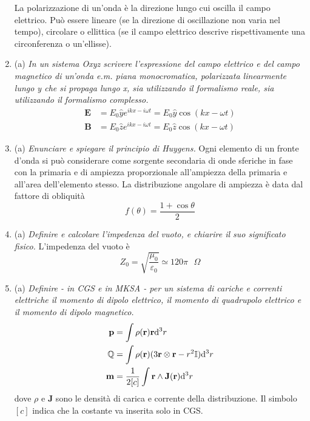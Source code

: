 \documentclass{article}
\renewcommand{\a}{(a)}
\renewcommand{\t}[1]{\textit{ #1}}
\renewcommand{\vec}[1]{\mathbf{#1}}
\begin{document}
\begin{enumerate}
		La polarizzazione di un'onda è la direzione lungo cui oscilla il campo elettrico. Può essere lineare (se la direzione di oscillazione non varia nel tempo), circolare o ellittica (se il campo elettrico descrive rispettivamente una circonferenza o un'ellisse).
		\item\a\t{In un sistema Oxyz scrivere l'espressione del campo elettrico e del campo magnetico di un'onda e.m. piana monocromatica, polarizzata linearmente lungo y che si propaga lungo x, sia utilizzando il formalismo reale, sia utilizzando il formalismo complesso.}
		\begin{align*}
			\vec{E}&=E_0\hat{y}e^{ikx-i\omega t}=E_0\hat{y}\cos(kx-\omega t)\\
			\vec{B}&=E_0\hat{z}e^{ikx-i\omega t}=E_0\hat{z}\cos(kx-\omega t)
		\end{align*}
		\item\a\t{Enunciare e spiegare il principio di Huygens.} Ogni elemento di un fronte d'onda si può considerare come sorgente secondaria di onde sferiche in fase con la primaria e di ampiezza proporzionale all'ampiezza della primaria e all'area dell'elemento stesso. La distribuzione angolare di ampiezza è data dal fattore di obliquità
		\[f(\theta)=\frac{1+\cos\theta}{2}\]
		\item\a\t{Definire e calcolare l'impedenza del vuoto, e chiarire il suo significato fisico.} L'impedenza del vuoto è
		\[Z_0=\sqrt{\frac{\mu_0}{\varepsilon_0}}\simeq 120\pi\textrm{ }\Omega\]
		\item\a\t{Definire - in CGS e in MKSA - per un sistema di cariche e correnti elettriche il momento di dipolo elettrico, il momento di quadrupolo elettrico e il momento di dipolo magnetico.}
		\begin{align*}
			\vec{p}&=\int\rho(\vec{r})\vec{r}\d^3r\\
			\mathbb{Q}&=\int\rho(\vec{r})(3\vec{r}\otimes\vec{r}-r^2\mathbb{I})\d^3r\\
			\vec{m}&=\frac{1}{2[c]}\int\vec{r}\wedge\vec{J}(\vec{r})\d^3 r
		\end{align*}
		dove $\rho$ e $\vec{J}$ sono le densità di carica e corrente della distribuzione. Il simbolo $[c]$ indica che la costante va inserita solo in CGS.
		

\end{enumerate}
\end{document}
